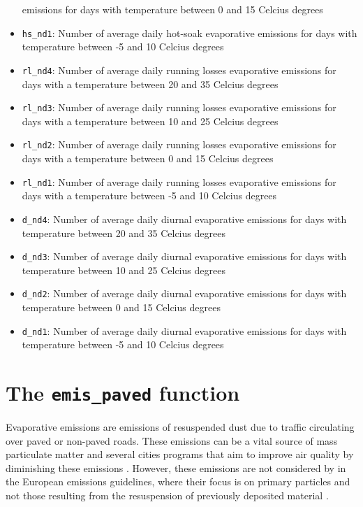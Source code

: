 \documentclass[12pt,graybox,envcountchap,sectrefs]{krantz}
\theoremstyle{definition}
\theoremstyle{definition}
\theoremstyle{definition}
\theoremstyle{remark}
\begin{document}
\begin{itemize}
  emissions for days with temperature between 0 and 15 Celcius degrees
\item
  \texttt{hs\_nd1}: Number of average daily hot-soak evaporative
  emissions for days with temperature between -5 and 10 Celcius degrees
\item
  \texttt{rl\_nd4}: Number of average daily running losses evaporative
  emissions for days with a temperature between 20 and 35 Celcius
  degrees
\item
  \texttt{rl\_nd3}: Number of average daily running losses evaporative
  emissions for days with a temperature between 10 and 25 Celcius
  degrees
\item
  \texttt{rl\_nd2}: Number of average daily running losses evaporative
  emissions for days with a temperature between 0 and 15 Celcius degrees
\item
  \texttt{rl\_nd1}: Number of average daily running losses evaporative
  emissions for days with a temperature between -5 and 10 Celcius
  degrees
\item
  \texttt{d\_nd4}: Number of average daily diurnal evaporative emissions
  for days with temperature between 20 and 35 Celcius degrees
\item
  \texttt{d\_nd3}: Number of average daily diurnal evaporative emissions
  for days with temperature between 10 and 25 Celcius degrees
\item
  \texttt{d\_nd2}: Number of average daily diurnal evaporative emissions
  for days with temperature between 0 and 15 Celcius degrees
\item
  \texttt{d\_nd1}: Number of average daily diurnal evaporative emissions
  for days with temperature between -5 and 10 Celcius degrees
\end{itemize}

\section{\texorpdfstring{The \texttt{emis\_paved}
function}{The emis\_paved function}}\label{the-emis_paved-function}

Evaporative emissions are emissions of resuspended dust due to traffic
circulating over paved or non-paved roads. These emissions can be a
vital source of mass particulate matter and several cities programs that
aim to improve air quality by diminishing these emissions
\citep{AMATO20103070}. However, these emissions are not considered by in
the European emissions guidelines, where their focus is on primary
particles and not those resulting from the resuspension of previously
deposited material \citep{NtziachristosBoulter2009}.
\end{document}
